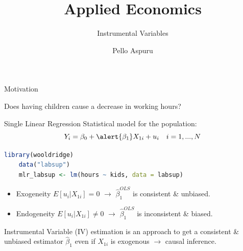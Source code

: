 \documentclass[11pt, aspectratio = 169]{beamer}
\title{Applied Economics}
\subtitle{Instrumental Variables}
\author{Pello Aspuru}
\date{}
\institute{Winter 2025/26}
\begin{document}
%

\maketitle
\sffamily

\begin{frame}[fragile]{Motivation}

\begin{center}
    Does having children \alert{cause} a decrease in working hours?
\end{center}
\pause
Single Linear Regression Statistical model for the population:
\[
Y_{i} = \beta_0 + \alert{\beta_1} X_{1i} + u_i \quad i=1,...,N
\]
\begin{lstlisting}[language=R]
    library(wooldridge)
    data("labsup")
    mlr_labsup <- lm(hours ~ kids, data = labsup)
\end{lstlisting}
\pause

\begin{itemize}
    \item Exogeneity $E[u_i | X_{1i}] = 0$ \pause $\rightarrow$ \alert{$\hat{\beta}_1^{OLS}$} is consistent \& unbiased.
    \item Endogeneity $E[u_i | X_{1i}] \neq 0$ \pause $\rightarrow$ \alert{$\hat{\beta}_1^{OLS}$} is inconsistent \& biased.
\end{itemize}
\pause
Instrumental Variable (IV) estimation is an approach to get a consistent \& unbiased estimator \alert{$\hat{\beta}_1$} even if $X_{1i}$ is exogenous \pause $\rightarrow$ causal inference.
\end{frame}
\end{document}
